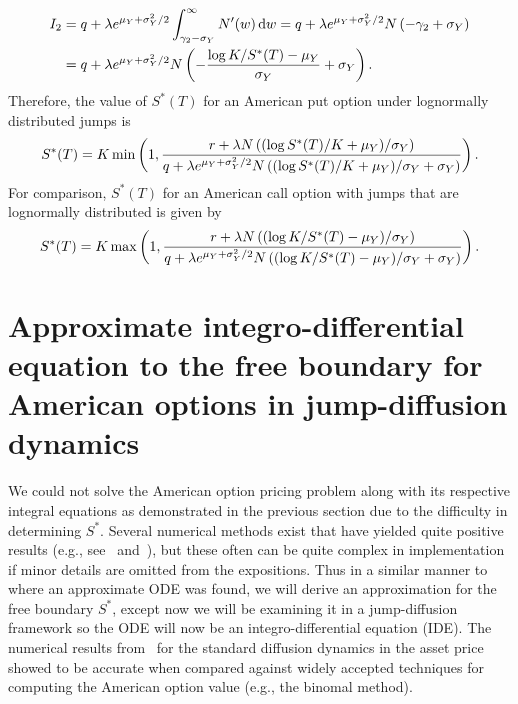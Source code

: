 	\begin{align*}
		I_2 &= q + \lambda e^{\mu_Y+\sigma_Y^2/2}\int_{\gamma_2 - \sigma_Y}^\infty N'(w) \, \mathrm d w = q + \lambda e^{\mu_Y+\sigma_Y^2/2}N\left(-\gamma_2 + \sigma_Y \right) \\
		&= q + \lambda e^{\mu_Y+\sigma_Y^2/2}N\left(-\frac{\log K/S^*(T) - \mu_Y}{\sigma_Y} + \sigma_Y \right).
	\end{align*}
Therefore, the value of $S^*(T)$ for an American put option under lognormally distributed jumps is
	\begin{equation}
		\label{eqn:freePutTLN}
		S^*(T) = K\min\left( 1, \frac{r + \lambda N \left(  (\log S^*(T)/K + \mu_Y)/\sigma_Y  \right)}{q + \lambda e^{\mu_Y+\sigma_Y^2/2}N\left((\log S^*(T)/K + \mu_Y)/\sigma_Y + \sigma_Y \right)}\right).
	\end{equation}
For comparison, $S^*(T)$ for an American call option with jumps that are lognormally distributed is given by~\cite{Chiarella2006}
		\begin{equation}
		\label{eqn:freeCallTLN}
		S^*(T) = K\max\left( 1, \frac{r + \lambda N \left(  (\log K/S^*(T) - \mu_Y)/\sigma_Y  \right)}{q + \lambda e^{\mu_Y+\sigma_Y^2/2}N\left((\log K/S^*(T) - \mu_Y)/\sigma_Y + \sigma_Y \right)}\right).
	\end{equation}
        	
        	\section{Approximate integro-differential equation to the free boundary for American options in jump-diffusion dynamics}
        	We could not solve the American option pricing problem along with its respective integral equations as demonstrated in the previous section due to the difficulty in determining $S^*$. Several numerical methods exist that have yielded quite positive results (e.g., see~\cite{Kallast2003} and~\cite{Chiarella2006}), but these often can be quite complex in implementation if minor details are omitted from the expositions. Thus in a similar manner to~\cite{Rodrigo2013} where an approximate ODE was found, we will derive an approximation for the free boundary $S^*$, except now we will be examining it in a jump-diffusion framework so the ODE will now be an integro-differential equation (IDE). The numerical results from~\cite{Rodrigo2013} for the standard diffusion dynamics in the asset price showed to be accurate when compared against widely accepted techniques for computing the American option value (e.g., the binomal method).
        	
